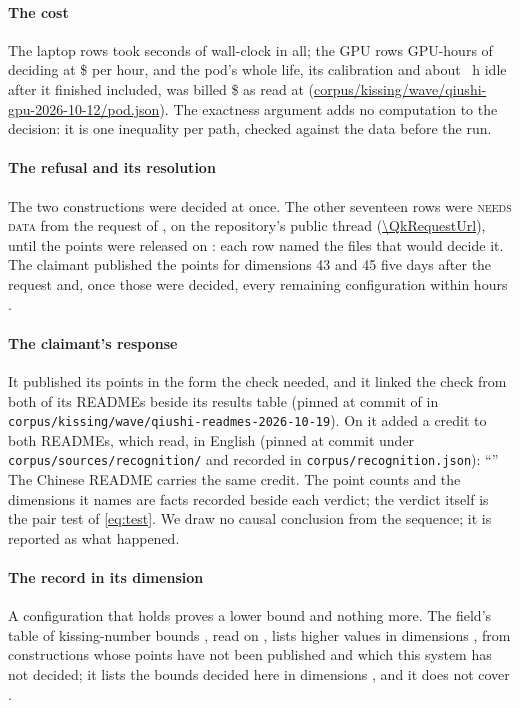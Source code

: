 \documentclass[preprint,11pt,authoryear,a4paper]{elsarticle}
\newcommand{\vword}[1]{{\normalfont\scshape #1}}
\newcommand{\vN}{\vword{needs data}}
\begin{document}
\paragraph{The cost} The \MtKwDeskRows{} laptop rows took \MtKwDeskSeconds{} seconds of wall-clock in all; the \MtKwGpuRows{} GPU rows \MtKwGpuHours{} GPU-hours of deciding at \$\MtKwGpuPrice{} per hour, and the pod's whole life, its calibration and about \MtKwPodIdle~h idle after it finished included, was billed \$\MtKwGpuCost{} as read at \MtKwBillReadAt{} (\url{corpus/kissing/wave/qiushi-gpu-2026-10-12/pod.json}). The exactness argument adds no computation to the decision: it is one inequality per path, checked against the data before the run.

\paragraph{The refusal and its resolution} The two constructions were decided at once. The other seventeen rows were \vN{} from the request of \MtKwRequestDate, on the repository's public thread (\url{\QkRequestUrl}), until the points were released on \MtKwPointsDates: each row named the files that would decide it. The claimant published the points for dimensions 43 and 45 five days after the request and, once those were decided, every remaining configuration within hours \citep{QiushiRelease}.

\paragraph{The claimant's response} It published its points in the form the check needed, and it linked the check from both of its READMEs beside its results table (pinned at commit \texttt{\QkReadmeCommit} of \QkReadmeDate{} in \texttt{corpus/kissing/wave/qiushi-readmes-2026-10-19}). On \QkCreditDate{} it added a credit to both READMEs, which read, in English (pinned at commit \texttt{\QkCreditCommit} under \texttt{corpus/sources/recognition/} and recorded in \texttt{corpus/recognition.json}): ``\QkCreditQuote'' The Chinese README carries the same credit. The point counts and the dimensions it names are facts recorded beside each verdict; the verdict itself is the pair test of \eqref{eq:test}. We draw no causal conclusion from the sequence; it is reported as what happened.

\paragraph{The record in its dimension} A configuration that holds proves a lower bound and nothing more. The field's table of kissing-number bounds \citep{CohnTable}, read on \QkCohnReadAt, lists higher values in dimensions \MtKwCohnHigher, from constructions whose points have not been published and which this system has not decided; it lists the bounds decided here in dimensions \MtKwCohnEqual, and it does not cover \MtKwCohnAbsent.
\end{document}
